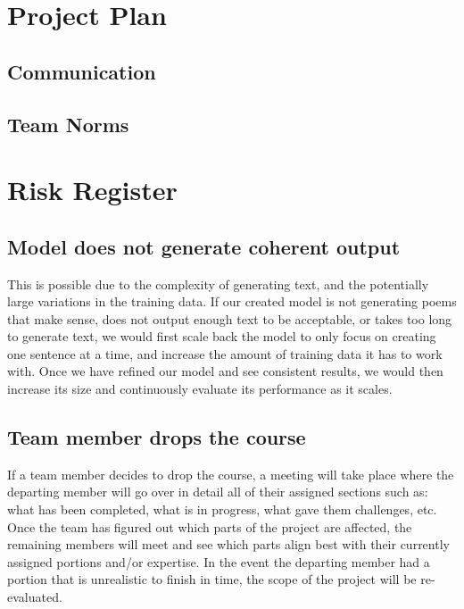 \documentclass{article} %
\begin{document}
\section{Project Plan}
\label{project_plan}

\subsection{Communication}

\subsection{Team Norms}


\section{Risk Register}
\label{risk_register}

\subsection{Model does not generate coherent output}

This is possible due to the complexity of generating text, and the potentially large variations in the training data. If our created model is not generating poems that make sense, does not output enough text to be acceptable, or takes too long to generate text, we would first scale back the model to only focus on creating one sentence at a time, and increase the amount of training data it has to work with. Once we have refined our model and see consistent results, we would then increase its size and continuously evaluate its performance as it scales.

\subsection{Team member drops the course}

If a team member decides to drop the course, a meeting will take place where the departing member will go over in detail all of their assigned sections such as: what has been completed, what is in progress, what gave them challenges, etc. Once the team has figured out which parts of the project are affected, the remaining members will meet and see which parts align best with their currently assigned portions and/or expertise. In the event the departing member had a portion that is unrealistic to finish in time, the scope of the project will be re-evaluated.
\end{document}
